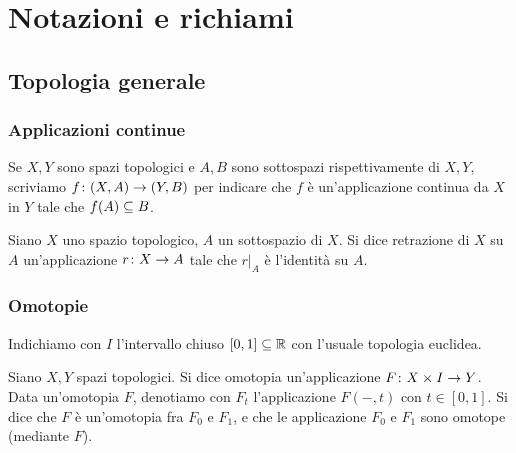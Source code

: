 \chapter*{Notazioni e richiami}
\section*{Topologia generale}
\subsection*{Applicazioni continue}
Se $X,Y$ sono spazi topologici e $A,B$ sono sottospazi rispettivamente di $X,Y$, scriviamo $f\colon(X,A)\to(Y,B)$ per indicare che $f$ è un'applicazione continua da $X$ in $Y$ tale che $f(A)\subseteq B$.
\begin{definition*}
Siano $X$ uno spazio topologico, $A$ un sottospazio di $X$. Si dice retrazione di $X$ su $A$ un'applicazione $r\colon X\to A$ tale che $r|_A$ è l'identità su $A$.
\end{definition*}
\subsection*{Omotopie}
Indichiamo con $I$ l'intervallo chiuso $[0,1]\subseteq\mathbb{R}$ con l'usuale topologia euclidea.
\begin{definition*}
Siano $X,Y$ spazi topologici. Si dice omotopia un'applicazione $F\colon X\times I\to Y$. Data un'omotopia $F$, denotiamo con $F_t$ l'applicazione $F(-,t)$ con $t\in[0,1]$. Si dice che $F$ è un'omotopia fra $F_0$ e $F_1$, e che le applicazione $F_0$ e $F_1$ sono omotope (mediante $F$).
\end{definition*}

